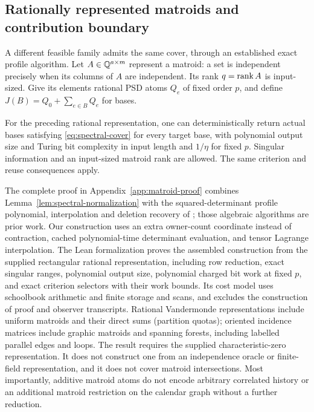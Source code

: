 \subsection{Rationally represented matroids and contribution boundary}
\label{subsec:matroid-cover}
A different feasible family admits the same cover, through an established
exact profile algorithm. Let $A\in\mathbb Q^{a\times m}$ represent a matroid:
a set is independent precisely when its columns of $A$ are independent.
Its rank $q=\operatorname{rank} A$ is input-sized. Give its elements rational PSD atoms
$Q_e$ of fixed order $p$, and define $J(B)=Q_0+\sum_{e\in B}Q_e$ for bases.
\begin{theorem}
\label{thm:matroid-spectral-set}
For the preceding rational representation, one can deterministically return
actual bases satisfying \eqref{eq:spectral-cover} for every target base,
with polynomial output size and Turing bit complexity in input length and
$1/\eta$ for fixed $p$. Singular information and an input-sized matroid
rank are allowed. The same criterion and reuse consequences apply.
\end{theorem}
The complete proof in Appendix~\ref{app:matroid-proof} combines
Lemma~\ref{lem:spectral-normalization} with the squared-determinant profile
polynomial, interpolation and deletion recovery of \citet{Berstein2008};
those algebraic algorithms are prior work. Our construction uses an extra
owner-count coordinate instead of contraction, cached polynomial-time
determinant evaluation, and tensor Lagrange interpolation. The Lean
formalization proves the assembled construction from the supplied rectangular
rational representation, including row reduction, exact singular ranges,
polynomial output size, polynomial charged bit work at fixed $p$, and exact
criterion selectors with their work bounds. Its cost model uses schoolbook
arithmetic and finite storage and scans, and excludes the construction of
proof and observer transcripts. Rational Vandermonde
representations include uniform matroids and their direct sums (partition
quotas); oriented incidence matrices include graphic matroids and spanning
forests, including labelled parallel edges and loops.
The result requires the supplied characteristic-zero representation. It does
not construct one from an independence oracle or finite-field representation,
and it does not cover matroid intersections. Most importantly, additive
matroid atoms do not encode arbitrary correlated history or an additional
matroid restriction on the calendar graph without a further reduction.

